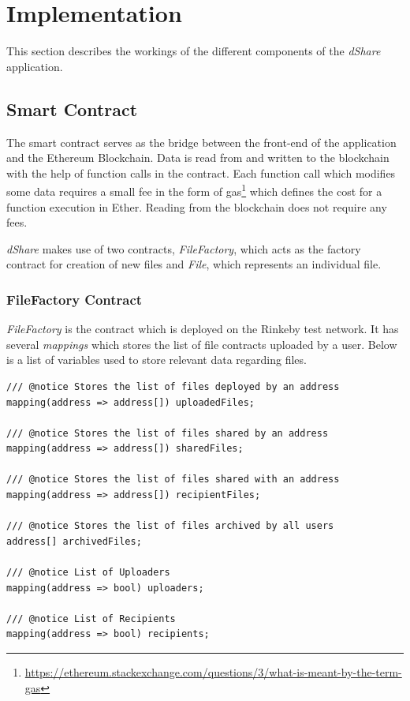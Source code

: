 \documentclass[]{article}
\begin{document}
	\newpage
	\section{Implementation}
		This section describes the workings of the different components of the \textit{dShare} application.
		
		\subsection{Smart Contract}
		The smart contract serves as the bridge between the front-end of the application and the Ethereum Blockchain. Data is read from and written to the blockchain with the help of function calls in the contract. Each function call which modifies some data requires a small fee in the form of gas\footnote{\url{https://ethereum.stackexchange.com/questions/3/what-is-meant-by-the-term-gas}} which defines the cost for a function execution in Ether. Reading from the blockchain does not require any fees.
		
		\textit{dShare} makes use of two contracts, \textit{FileFactory}, which acts as the factory contract for creation of new files and \textit{File}, which represents an individual file.
		
		\subsubsection{FileFactory Contract}
		\textit{FileFactory} is the contract which is deployed on the Rinkeby test network. It has several \textit{mappings} which stores the list of file contracts uploaded by a user. Below is a list of variables used to store relevant data regarding files.
		
\begin{verbatim}
/// @notice Stores the list of files deployed by an address
mapping(address => address[]) uploadedFiles;

/// @notice Stores the list of files shared by an address
mapping(address => address[]) sharedFiles;

/// @notice Stores the list of files shared with an address
mapping(address => address[]) recipientFiles;

/// @notice Stores the list of files archived by all users
address[] archivedFiles;

/// @notice List of Uploaders
mapping(address => bool) uploaders;

/// @notice List of Recipients
mapping(address => bool) recipients;
\end{verbatim}
\end{document}
